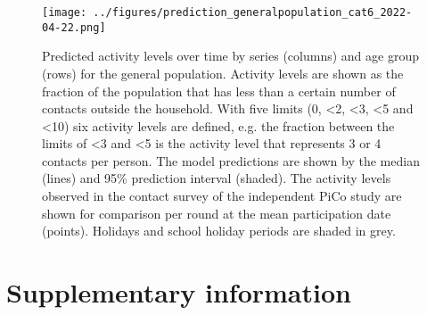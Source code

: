 \documentclass[fleqn,10pt]{wlscirep}
\begin{document}
\clearpage

\begin{figure}[ht]
\centering
\texttt{[image: ../figures/prediction\_generalpopulation\_cat6\_2022-04-22.png]}
\caption{Predicted activity levels over time by series (columns) and age group (rows) for the general population. Activity levels are shown as the fraction of the population that has less than a certain number of contacts outside the household. With five limits (0, <2, <3, <5 and <10) six activity levels are defined, e.g. the fraction between the limits of <3 and <5 is the activity level that represents 3 or 4 contacts per person. The model predictions are shown by the median (lines) and 95\% prediction interval (shaded). The activity levels observed in the contact survey of the independent PiCo study are shown for comparison per round at the mean participation date (points). Holidays and school holiday periods are shaded in grey.}
\label{fig:genpop}
\end{figure}

\clearpage



\section*{Supplementary information}


\renewcommand{\thefigure}{S\arabic{figure}}
\setcounter{figure}{0}
\renewcommand{\thetable}{S\arabic{table}}
\setcounter{table}{0}
\end{document}
